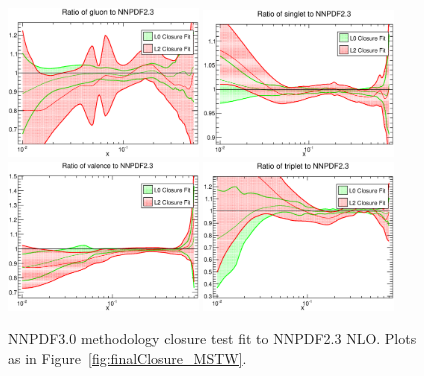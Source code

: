 \begin{figure}[!]
\centering
\includegraphics[width=0.45\textwidth]{7-PostLHC/figs/finalClosure/NNPDF23/gluon.eps}
\includegraphics[width=0.45\textwidth]{7-PostLHC/figs/finalClosure/NNPDF23/singlet.eps}
\includegraphics[width=0.45\textwidth]{7-PostLHC/figs/finalClosure/NNPDF23/valence.eps}
\includegraphics[width=0.45\textwidth]{7-PostLHC/figs/finalClosure/NNPDF23/triplet.eps}
\caption[NNPDF3.0 methodology closure test fit to NNPDF2.3 NLO]{NNPDF3.0 methodology closure test fit to NNPDF2.3 NLO. Plots as in Figure~\ref{fig:finalClosure_MSTW}. }
\label{fig:finalClosure_NNPDF}
\end{figure}
